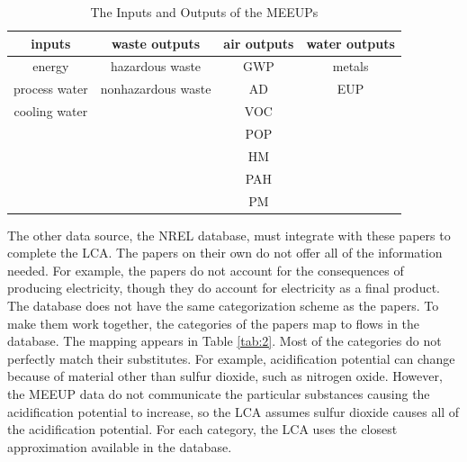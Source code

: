 \documentclass[final,journal,10pt,letterpaper,oneside,twocolumn,compsoc]%
{IEEEtran}
\begin{document}
\begin{table}[t!]
\caption{The Inputs and Outputs of the MEEUPs}
\centering
\begin{tabular}{|c|*{2}{c|}c|}
  \hline
  inputs        & waste outputs       & air outputs & water outputs \\
  \hline
  energy        & hazardous waste     & GWP         & metals \\
  process water & nonhazardous waste & AD          & EUP \\
  cooling water &                     & VOC         &  \\
                &                     & POP         &  \\
                &                     & HM          &  \\
                &                     & PAH         &  \\
                &                     & PM          &  \\
  \hline
\end{tabular}
\label{tab:1}
\end{table}

The other data source, the NREL database, must integrate with these papers to
complete the LCA. The papers on their own do not offer all of the information
needed. For example, the papers do not account for the consequences of producing
electricity, though they do account for electricity as a final product. The
database does not have the same categorization scheme as the papers. To make
them
work together, the categories of the papers map to flows in the database. The
mapping appears in Table \ref{tab:2}. Most of the categories do not perfectly
match their substitutes. For example, acidification potential can change because
of
material other than sulfur dioxide, such as nitrogen oxide. However, the MEEUP
data do not communicate the particular substances causing the acidification
potential to increase, so the LCA assumes sulfur dioxide causes all of the
acidification potential. For each category,
the LCA uses the closest approximation available in the database.
\end{document}
